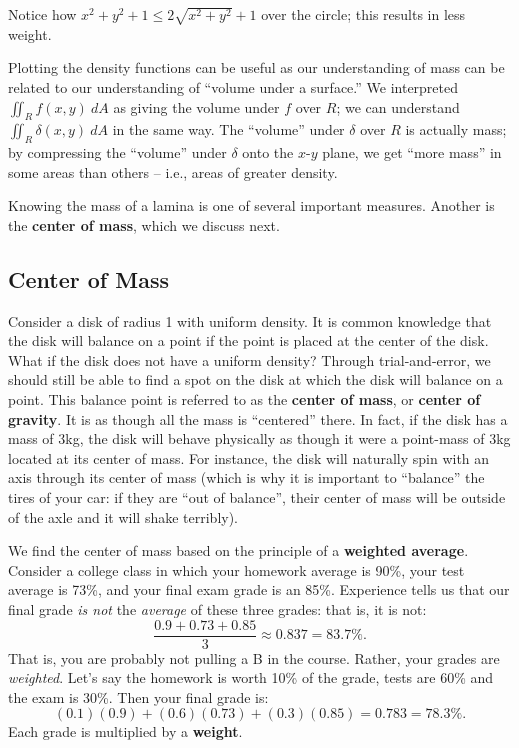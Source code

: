 {Notice how $x^2+y^2+1 \leq 2\sqrt{x^2+y^2}+1$ over the circle; this results in less weight.}

Plotting the density functions can be useful as our understanding of mass can be related to our understanding of ``volume under a surface.'' We interpreted $\iint_R f(x,y)\ dA$ as giving the volume under $f$ over $R$; we can understand $\iint_R\delta(x,y)\ dA$ in the same way. The ``volume'' under $\delta$ over $R$ is actually mass; by compressing the ``volume'' under $\delta$ onto the $x$-$y$ plane, we get ``more mass'' in some areas than others -- i.e., areas of greater density.

Knowing the mass of a lamina is one of several important measures. Another is the \textbf{center of mass}, which we discuss next.

\subsection*{Center of Mass}

Consider a disk of radius 1 with uniform density. It is common knowledge that the disk will balance on a point if the point is placed at the center of the disk. What if the disk does not have a uniform density? Through trial-and-error, we should still be able to find a spot on the disk at which the disk will balance on a point. This balance point is referred to as the \textbf{center of mass}, or \textbf{center of gravity}. It is as though all the mass is ``centered'' there. In fact, if the disk has a mass of 3kg, the disk will behave physically as though it were a point-mass of 3kg located at its center of mass. For instance, the disk will naturally spin with an axis through its center of mass (which is why it is important to ``balance'' the tires of your car: if they are ``out of balance'', their center of mass will be outside of the axle and it will shake terribly).

We find the center of mass based on the principle of a \textbf{weighted average}. Consider a college class in which your homework average is 90\%, your test average is 73\%, and your final exam grade is an 85\%. Experience tells us that our final grade \textit{is not} the \textit{average} of these three grades: that is, it is not:
\[\frac{0.9+0.73+0.85}{3} \approx 0.837 = 83.7\text{\%}.\]
That is, you are probably not pulling a B in the course. Rather, your grades are \textit{weighted}. Let's say the homework is worth 10\% of the grade, tests are 60\% and the exam is 30\%. Then your final grade is:
\[(0.1)(0.9) + (0.6)(0.73)+(0.3)(0.85) = 0.783 = 78.3\text{\%}.\]
Each grade is multiplied by a \textbf{weight}. 

